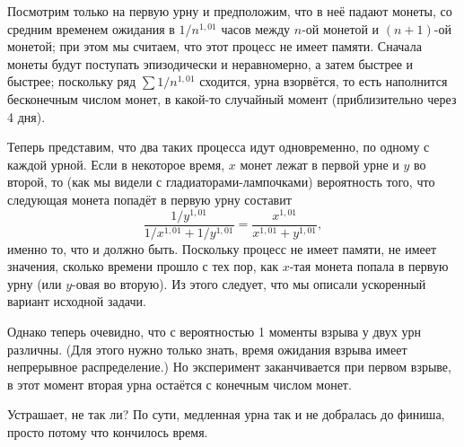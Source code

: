 \medskip

Посмотрим только на первую урну и предположим, что в неё падают монеты, со средним временем ожидания в $1/n^{1{,}01}$ часов между $n$-ой монетой и $(n+1)$-ой монетой; при этом мы считаем, что этот процесс не имеет памяти.
Сначала монеты будут поступать эпизодически и неравномерно, а затем быстрее и быстрее;
поскольку ряд $\sum 1/n^{1{,}01}$ сходится, урна взорвётся, то есть наполнится бесконечным числом монет, в какой-то случайный момент (приблизительно через 4 дня).

Теперь представим, что два таких процесса идут одновременно, по одному с каждой урной.
Если в некоторое время, $x$ монет лежат в первой урне и $y$ во второй, то (как мы видели с гладиаторами-лампочками) 
вероятность того, что следующая монета попадёт в первую урну составит
\[\frac{1/y^{1{,}01}}{1/x^{1{,}01}+1/y^{1{,}01}}=\frac{x^{1{,}01}}{x^{1{,}01}+y^{1{,}01}},\]
именно то, что и должно быть.
Поскольку процесс не имеет памяти,
не имеет значения, сколько времени прошло с тех пор, как $x$-тая монета попала в первую урну (или $y$-овая во вторую).
Из этого следует, что мы описали ускоренный вариант исходной задачи.

Однако теперь очевидно, что с вероятностью 1 моменты взрыва у двух урн различны.
(Для этого нужно только знать, время ожидания взрыва имеет непрерывное распределение.)
Но эксперимент заканчивается при первом взрыве, в этот момент вторая урна остаётся с конечным числом монет.\heart

Устрашает, не так ли?
По сути, медленная урна так и не добралась до финиша, просто потому что кончилось время.
